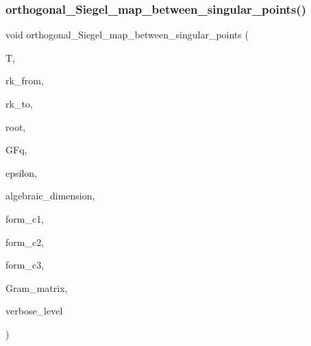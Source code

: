 \mbox{\label{_l_i_b_2_g_a_l_o_i_s_2orthogonal__points_8_c_a2c6c42534b7915aacd84bb9725488fa9}} 
\subsubsection{\texorpdfstring{orthogonal\+\_\+\+Siegel\+\_\+map\+\_\+between\+\_\+singular\+\_\+points()}{orthogonal\_Siegel\_map\_between\_singular\_points()}}
{\footnotesize\ttfamily void orthogonal\+\_\+\+Siegel\+\_\+map\+\_\+between\+\_\+singular\+\_\+points (\begin{DoxyParamCaption}\item[{\mbox{\hyperlink{galois_8h_a09fddde158a3a20bd2dcadb609de11dc}{I\+NT}} $\ast$}]{T,  }\item[{\mbox{\hyperlink{galois_8h_a09fddde158a3a20bd2dcadb609de11dc}{I\+NT}}}]{rk\+\_\+from,  }\item[{\mbox{\hyperlink{galois_8h_a09fddde158a3a20bd2dcadb609de11dc}{I\+NT}}}]{rk\+\_\+to,  }\item[{\mbox{\hyperlink{galois_8h_a09fddde158a3a20bd2dcadb609de11dc}{I\+NT}}}]{root,  }\item[{\mbox{\hyperlink{classfinite__field}{finite\+\_\+field}} \&}]{G\+Fq,  }\item[{\mbox{\hyperlink{galois_8h_a09fddde158a3a20bd2dcadb609de11dc}{I\+NT}}}]{epsilon,  }\item[{\mbox{\hyperlink{galois_8h_a09fddde158a3a20bd2dcadb609de11dc}{I\+NT}}}]{algebraic\+\_\+dimension,  }\item[{\mbox{\hyperlink{galois_8h_a09fddde158a3a20bd2dcadb609de11dc}{I\+NT}}}]{form\+\_\+c1,  }\item[{\mbox{\hyperlink{galois_8h_a09fddde158a3a20bd2dcadb609de11dc}{I\+NT}}}]{form\+\_\+c2,  }\item[{\mbox{\hyperlink{galois_8h_a09fddde158a3a20bd2dcadb609de11dc}{I\+NT}}}]{form\+\_\+c3,  }\item[{\mbox{\hyperlink{galois_8h_a09fddde158a3a20bd2dcadb609de11dc}{I\+NT}} $\ast$}]{Gram\+\_\+matrix,  }\item[{\mbox{\hyperlink{galois_8h_a09fddde158a3a20bd2dcadb609de11dc}{I\+NT}}}]{verbose\+\_\+level }\end{DoxyParamCaption})}

